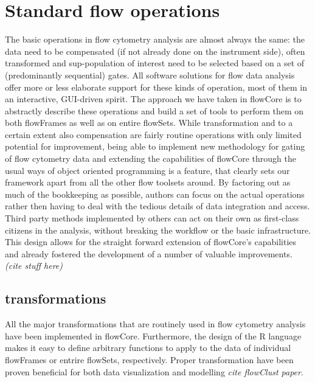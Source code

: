 \documentclass[12pt]{article}
\begin{document}
\section{Standard flow operations}
The basic operations in flow cytometry analysis are almost always the
same: the data need to be compensated (if not already done on the
instrument side), often transformed and sup-population of interest
need to be selected based on a set of (predominantly sequential)
gates. All software solutions for flow data analysis offer more or
less elaborate support for these kinds of operation, most of them in
an interactive, GUI-driven spirit. The approach we have taken in
flowCore is to abstractly describe these operations and build a set of
tools to perform them on both flowFrames as well as on entire
flowSets. While transformation and to a certain extent also
compensation are fairly routine operations with only limited potential
for improvement, being able to implement new methodology for gating of
flow cytometry data and extending the capabilities of flowCore through
the usual ways of object oriented programming is a feature, that
clearly sets our framework apart from all the other flow toolsets
around. By factoring out as much of the bookkeeping as possible,
authors can focus on the actual operations rather then having to deal
with the tedious details of data integration and access. Third party
methods implemented by others can act on their own as first-class
citizens in the analysis, without breaking the workflow or the basic
infrastructure. This design allows for the straight forward extension
of flowCore's capabilities and already fostered the development of a
number of valuable improvements. \textit{(cite stuff here)}




\subsection{transformations}
All the major transformations that are routinely used in flow
cytometry analysis have been implemented in flowCore. Furthermore, the
design of the R language makes it easy to define arbitrary functions
to apply to the data of individual flowFrames or entrire flowSets,
respectively. Proper transformation have been proven beneficial for
both data visualization and modelling \textit{cite flowClust paper}. 
\end{document}
